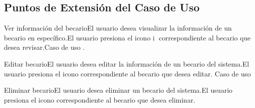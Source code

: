 	\subsection{Puntos de Extensión del Caso de Uso}

	
	\begin{UCExtenssionPoint}{Ver información del becario}{El usuario desea visualizar la información de un becario en específico.}{El usuario presiona el icono \textcircled{i} correspondiente al becario que desea revisar.}{Caso de uso .} 
	\end{UCExtenssionPoint}
	\begin{UCExtenssionPoint}{Editar becario}{El usuario desea editar la información de un becario del sistema.}{El usuario presiona el icono \faEdit correspondiente al becario que desea editar.} Caso de uso {} 
	\end{UCExtenssionPoint}
	
	\begin{UCExtenssionPoint}{Eliminar becario}{El usuario desea eliminar un becario del sistema.}{El usuario presiona el icono \faTrashO  correspondiente al becario que desea eliminar.}{} 
	\end{UCExtenssionPoint}

